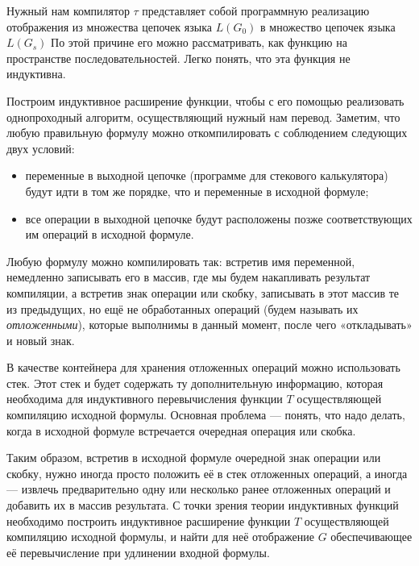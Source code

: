 Нужный нам компилятор $\tau$ представляет собой программную реализацию отображения из
множества цепочек языка $L(G_0)$ в множество цепочек языка $L(G_s)$ По этой причине его можно
рассматривать, как функцию на пространстве последовательностей. Легко понять,
что эта функция не индуктивна.

Построим индуктивное расширение функции, чтобы с его помощью реализовать однопроходный алгоритм, осуществляющий нужный нам перевод. Заметим, что любую
правильную формулу можно откомпилировать с соблюдением следующих двух условий:
\begin{itemize}
\item переменные в выходной цепочке (программе для стекового калькулятора) будут идти
в том же порядке, что и переменные в исходной формуле;
\item все операции в выходной цепочке будут расположены позже соответствующих им
операций в исходной формуле.
\end{itemize}

Любую формулу можно компилировать так: встретив имя переменной, немедленно
записывать его в массив, где мы будем накапливать результат компиляции, а
встретив знак операции или скобку, записывать в этот массив те из предыдущих,
но ещё не обработанных операций (будем называть их \emph{отложенными}), которые
выполнимы в данный момент, после чего «откладывать» и новый знак.

В качестве контейнера для хранения отложенных операций можно использовать стек.
Этот стек и будет содержать ту дополнительную информацию, которая необходима для
индуктивного перевычисления функции $T$ осуществляющей компиляцию исходной формулы.
Основная проблема — понять, что надо делать, когда в исходной формуле встречается
очередная операция или скобка.

Таким образом, встретив в исходной формуле очередной знак операции или скобку,
нужно иногда просто положить её в стек отложенных операций, а иногда — извлечь
предварительно одну или несколько ранее отложенных операций и добавить их в
массив результата. С точки зрения теории индуктивных функций необходимо построить
индуктивное расширение функции $T$ осуществляющей компиляцию исходной формулы, и
найти для неё отображение $G$ обеспечивающее её перевычисление при удлинении входной формулы.

